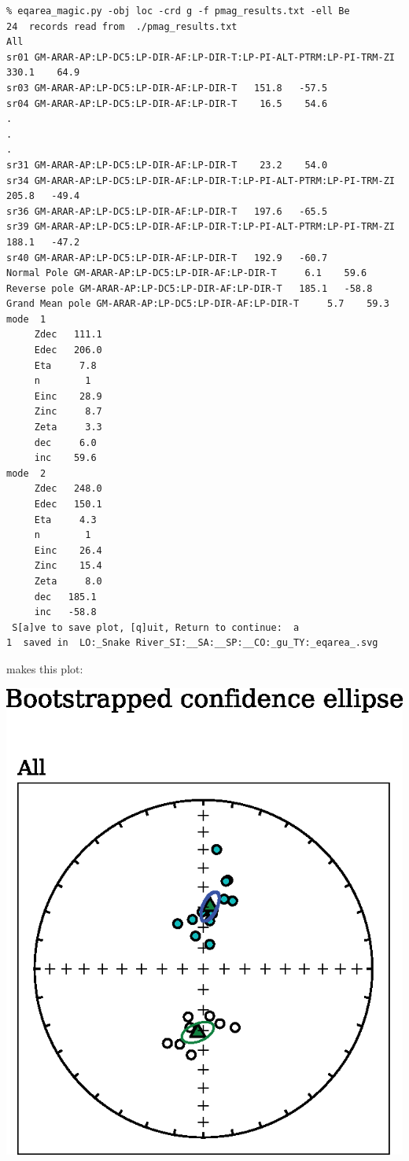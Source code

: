 \documentclass[11pt]{book}
\begin{document}
{{{{\begin{verbatim}
% eqarea_magic.py -obj loc -crd g -f pmag_results.txt -ell Be
24  records read from  ./pmag_results.txt
All
sr01 GM-ARAR-AP:LP-DC5:LP-DIR-AF:LP-DIR-T:LP-PI-ALT-PTRM:LP-PI-TRM-ZI   330.1    64.9
sr03 GM-ARAR-AP:LP-DC5:LP-DIR-AF:LP-DIR-T   151.8   -57.5
sr04 GM-ARAR-AP:LP-DC5:LP-DIR-AF:LP-DIR-T    16.5    54.6
.
.
.
sr31 GM-ARAR-AP:LP-DC5:LP-DIR-AF:LP-DIR-T    23.2    54.0
sr34 GM-ARAR-AP:LP-DC5:LP-DIR-AF:LP-DIR-T:LP-PI-ALT-PTRM:LP-PI-TRM-ZI   205.8   -49.4
sr36 GM-ARAR-AP:LP-DC5:LP-DIR-AF:LP-DIR-T   197.6   -65.5
sr39 GM-ARAR-AP:LP-DC5:LP-DIR-AF:LP-DIR-T:LP-PI-ALT-PTRM:LP-PI-TRM-ZI   188.1   -47.2
sr40 GM-ARAR-AP:LP-DC5:LP-DIR-AF:LP-DIR-T   192.9   -60.7
Normal Pole GM-ARAR-AP:LP-DC5:LP-DIR-AF:LP-DIR-T     6.1    59.6
Reverse pole GM-ARAR-AP:LP-DC5:LP-DIR-AF:LP-DIR-T   185.1   -58.8
Grand Mean pole GM-ARAR-AP:LP-DC5:LP-DIR-AF:LP-DIR-T     5.7    59.3
mode  1
     Zdec   111.1
     Edec   206.0
     Eta     7.8
     n        1
     Einc    28.9
     Zinc     8.7
     Zeta     3.3
     dec     6.0
     inc    59.6
mode  2
     Zdec   248.0
     Edec   150.1
     Eta     4.3
     n        1
     Einc    26.4
     Zinc    15.4
     Zeta     8.0
     dec   185.1
     inc   -58.8
 S[a]ve to save plot, [q]uit, Return to continue:  a
1  saved in  LO:_Snake River_SI:__SA:__SP:__CO:_gu_TY:_eqarea_.svg
\end{verbatim}

\noindent makes this plot:

{\hskip 3.5cm %
 \includegraphics[width=10 cm]{EPSfiles/eqarea-magic.eps}}

}}}}
\end{document}
